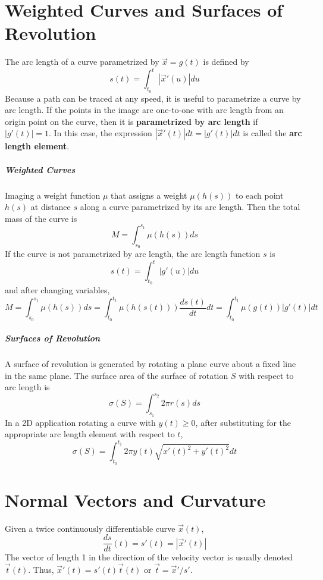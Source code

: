 \documentclass[11pt]{article}
\begin{document}
\section{Weighted Curves and Surfaces of Revolution}
	The arc length of a curve parametrized by $\vec{x} = g(t)$ is defined by
	\begin{equation}
		s(t) = \int_{t_0}^t |\vec{x}'(u)| du
	\end{equation}
	Because a path can be traced at any speed, it is useful to parametrize a curve by arc length. If the points in the image are one-to-one with arc length from an origin point on the curve, then it is \textbf{parametrized by arc length} if $|g'(t)| = 1$. In this case, the expression $|\vec{x}'(t)|dt = |g'(t)|dt$ is called the \textbf{arc length element}.
	
	\subparagraph{Weighted Curves} Imaging a weight function $\mu$ that assigns a weight $\mu(h(s))$ to each point $h(s)$ at distance $s$ along a curve parametrized by its arc length. Then the total mass of the curve is
	\begin{equation}
		M = \int_{s_0}^{s_1} \mu(h(s))ds
	\end{equation}
	If the curve is not parametrized by arc length, the arc length function $s$ is
	\begin{equation}
		s(t) = \int_{t_0}^t |g'(u)|du
	\end{equation}
	and after changing variables,
	\begin{equation}
		M = \int_{s_0}^{s_1} \mu(h(s))ds = \int_{t_0}^{t_1} \mu(h(s(t)))\frac{ds(t)}{dt}dt = \int_{t_0}^{t_1} \mu(g(t))|g'(t)|dt
	\end{equation}
	
	\subparagraph{Surfaces of Revolution} A surface of revolution is generated by rotating a plane curve about a fixed line in the same plane. The surface area of the surface of rotation $S$ with respect to arc length is
	\begin{equation}
		\sigma (S) = \int_{s_1}^{s_2} 2\pi r(s)ds
	\end{equation}
	In a 2D application rotating a curve with $y(t) \geq 0$, after substituting for the appropriate arc length element with respect to $t$,
	\begin{equation}
		\sigma (S) = \int_{t_0}^{t_1} 2\pi y(t) \sqrt{x'(t)^2 + y'(t)^2} dt
	\end{equation}
	
\section{Normal Vectors and Curvature}
	Given a twice continuously differentiable curve $\vec{x}(t)$,
	\begin{equation}
		\frac{ds}{dt}(t) = s'(t) = |\vec{x}'(t)|
	\end{equation}
	The vector of length 1 in the direction of the velocity vector is usually denoted $\vec{t}(t)$.  Thus, $\vec{x}'(t) = s'(t)\vec{t}(t)$ or $\vec{t} = \vec{x}' / s'$.
	
\end{document}
